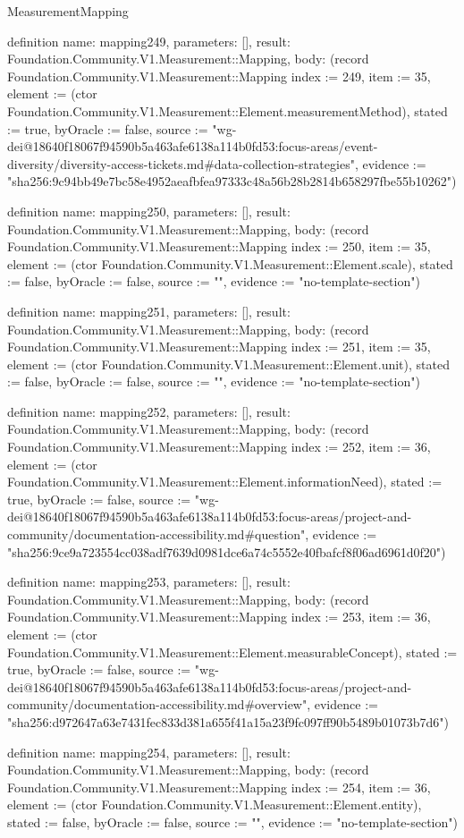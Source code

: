 \begin{lexlean}{MeasurementMapping}
\begin{semanticmodule}
definition{
  name: mapping249,
  parameters: [],
  result: Foundation.Community.V1.Measurement::Mapping,
  body: (record Foundation.Community.V1.Measurement::Mapping {index := 249, item := 35, element := (ctor Foundation.Community.V1.Measurement::Element.measurementMethod), stated := true, byOracle := false, source := "wg-dei@18640f18067f94590b5a463afe6138a114b0fd53:focus-areas/event-diversity/diversity-access-tickets.md#data-collection-strategies", evidence := "sha256:9c94bb49e7bc58e4952aeafbfea97333c48a56b28b2814b658297fbe55b10262"})
}

definition{
  name: mapping250,
  parameters: [],
  result: Foundation.Community.V1.Measurement::Mapping,
  body: (record Foundation.Community.V1.Measurement::Mapping {index := 250, item := 35, element := (ctor Foundation.Community.V1.Measurement::Element.scale), stated := false, byOracle := false, source := "", evidence := "no-template-section"})
}

definition{
  name: mapping251,
  parameters: [],
  result: Foundation.Community.V1.Measurement::Mapping,
  body: (record Foundation.Community.V1.Measurement::Mapping {index := 251, item := 35, element := (ctor Foundation.Community.V1.Measurement::Element.unit), stated := false, byOracle := false, source := "", evidence := "no-template-section"})
}

definition{
  name: mapping252,
  parameters: [],
  result: Foundation.Community.V1.Measurement::Mapping,
  body: (record Foundation.Community.V1.Measurement::Mapping {index := 252, item := 36, element := (ctor Foundation.Community.V1.Measurement::Element.informationNeed), stated := true, byOracle := false, source := "wg-dei@18640f18067f94590b5a463afe6138a114b0fd53:focus-areas/project-and-community/documentation-accessibility.md#question", evidence := "sha256:9ce9a723554cc038adf7639d0981dce6a74c5552e40fbafcf8f06ad6961d0f20"})
}

definition{
  name: mapping253,
  parameters: [],
  result: Foundation.Community.V1.Measurement::Mapping,
  body: (record Foundation.Community.V1.Measurement::Mapping {index := 253, item := 36, element := (ctor Foundation.Community.V1.Measurement::Element.measurableConcept), stated := true, byOracle := false, source := "wg-dei@18640f18067f94590b5a463afe6138a114b0fd53:focus-areas/project-and-community/documentation-accessibility.md#overview", evidence := "sha256:d972647a63e7431fec833d381a655f41a15a23f9fc097ff90b5489b01073b7d6"})
}

definition{
  name: mapping254,
  parameters: [],
  result: Foundation.Community.V1.Measurement::Mapping,
  body: (record Foundation.Community.V1.Measurement::Mapping {index := 254, item := 36, element := (ctor Foundation.Community.V1.Measurement::Element.entity), stated := false, byOracle := false, source := "", evidence := "no-template-section"})
}


\end{semanticmodule}
\end{lexlean}
